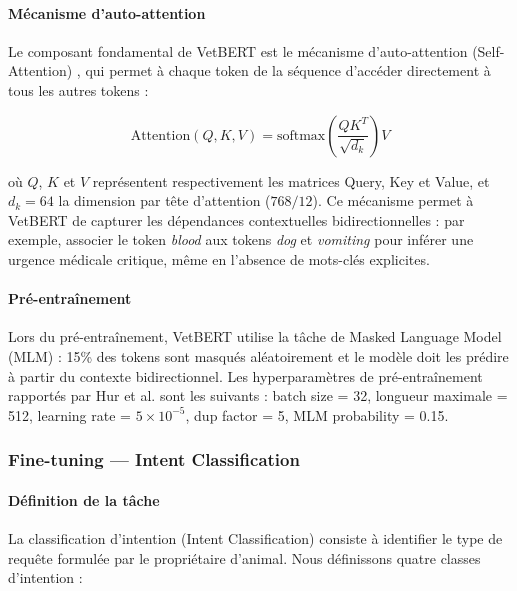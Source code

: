 \paragraph{Mécanisme d'auto-attention}

Le composant fondamental de VetBERT est le mécanisme d'auto-attention (Self-Attention) \cite{vaswani2017attention}, qui permet à chaque token de la séquence d'accéder directement à tous les autres tokens :

\begin{equation}
\text{Attention}(Q, K, V) = \text{softmax}
\left(\frac{QK^T}{\sqrt{d_k}}\right) V
\end{equation}

où $Q$, $K$ et $V$ représentent respectivement les matrices Query, Key et Value, et $d_k = 64$ la dimension par tête d'attention ($768/12$). Ce mécanisme permet à VetBERT de capturer les dépendances contextuelles bidirectionnelles : par exemple, associer le token \textit{blood} aux tokens \textit{dog} et \textit{vomiting} pour inférer une urgence médicale critique, même en l'absence de mots-clés explicites.

\paragraph{Pré-entraînement}

Lors du pré-entraînement, VetBERT utilise la tâche de Masked Language Model (MLM) : 15\% des tokens sont masqués aléatoirement et le modèle doit les prédire à partir du contexte bidirectionnel. Les hyperparamètres de pré-entraînement rapportés par Hur et al. sont les suivants : batch size = 32, longueur maximale = 512, learning rate = $5 \times 10^{-5}$, dup factor = 5, MLM probability = 0.15.

\subsubsection{Fine-tuning — Intent Classification}

\paragraph{Définition de la tâche}

La classification d'intention (Intent Classification) consiste à identifier le type de requête formulée par le propriétaire d'animal. Nous définissons quatre classes d'intention :

